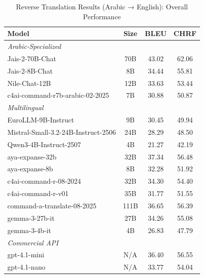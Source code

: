 \begin{table}[htbp]
\centering
\caption{Reverse Translation Results (Arabic → English): Overall Performance}
\label{tab:reverse_overall}
\begin{tabular}{l@{\hspace{3pt}}c@{\hspace{3pt}}c@{\hspace{3pt}}c}
\toprule
Model & Size & BLEU & CHRF \\
\midrule
\multicolumn{4}{l}{\textit{Arabic-Specialized}} \\
\midrule
Jais-2-70B-Chat & 70B & 43.02 & 62.06 \\
Jais-2-8B-Chat & 8B & 34.44 & 55.81 \\
Nile-Chat-12B & 12B & 33.63 & 53.44 \\
c4ai-command-r7b-arabic-02-2025 & 7B & 30.88 & 50.87 \\
\midrule
\multicolumn{4}{l}{\textit{Multilingual}} \\
\midrule
EuroLLM-9B-Instruct & 9B & 30.45 & 49.94 \\
Mistral-Small-3.2-24B-Instruct-2506 & 24B & 28.29 & 48.50 \\
Qwen3-4B-Instruct-2507 & 4B & 21.27 & 42.19 \\
aya-expanse-32b & 32B & 37.34 & 56.48 \\
aya-expanse-8b & 8B & 32.28 & 51.92 \\
c4ai-command-r-08-2024 & 32B & 34.30 & 54.40 \\
c4ai-command-r-v01 & 35B & 31.77 & 51.55 \\
command-a-translate-08-2025 & 111B & 36.65 & 56.39 \\
gemma-3-27b-it & 27B & 34.26 & 55.08 \\
gemma-3-4b-it & 4B & 26.83 & 47.79 \\
\midrule
\multicolumn{4}{l}{\textit{Commercial API}} \\
\midrule
gpt-4.1-mini & N/A & 36.40 & 56.55 \\
gpt-4.1-nano & N/A & 33.77 & 54.04 \\
\midrule
\bottomrule
\end{tabular}
\end{table}